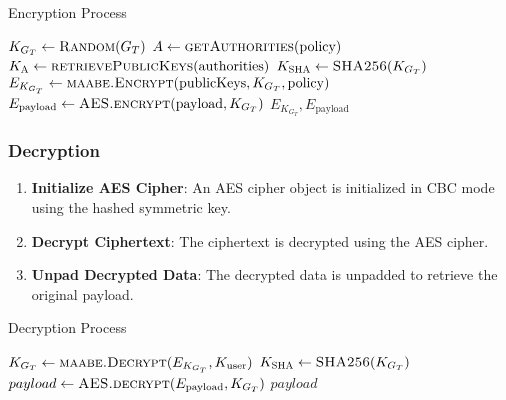 \begin{algorithm}
    \caption{Encryption Process}
    \label{alg:encryption_process}
    \scriptsize
    \begin{algorithmic}[1]
        \State $K_{G_T} \gets \textsc{Random}(G_T)$
        \State $A \gets \textsc{getAuthorities}(\text{policy})$
        \State $K_{\textsc{A}} \gets \textsc{retrievePublicKeys}(\text{authorities})$
        \State $K_{\textsc{SHA}} \gets \textsc{SHA256}(K_{G_T})$
        \State $E_{K_{G_T}} \gets \textsc{maabe.Encrypt}(\text{publicKeys}, K_{G_T}, \text{policy})$
        \State $E_{\text{payload}} \gets \textsc{AES.encrypt}(\text{payload}, K_{G_T})$
        \State \Return $E_{K_{G_T}}, E_{\text{payload}}$
    \EndProcedure
    \end{algorithmic}
\end{algorithm}


\subsubsection{Decryption}

\begin{enumerate}
    \item \textbf{Initialize AES Cipher}: An AES cipher object is initialized in CBC mode using the hashed symmetric key.
    \item \textbf{Decrypt Ciphertext}: The ciphertext is decrypted using the AES cipher.
    \item \textbf{Unpad Decrypted Data}: The decrypted data is unpadded to retrieve the original payload.
\end{enumerate}

\begin{algorithm}
    \caption{Decryption Process}
    \label{alg:decryption_process}
    \scriptsize
    \begin{algorithmic}[1]
        \State $K_{G_T} \gets \textsc{maabe.Decrypt}(E_{K_{G_T}}, K_{\text{user}})$
        \State $K_{\textsc{SHA}} \gets \textsc{SHA256}(K_{G_T})$
        \State $payload \gets \textsc{AES.decrypt}(E_{\text{payload}}, K_{G_T})$
        \State \Return $payload$
    \EndProcedure
    \end{algorithmic}
\end{algorithm}
